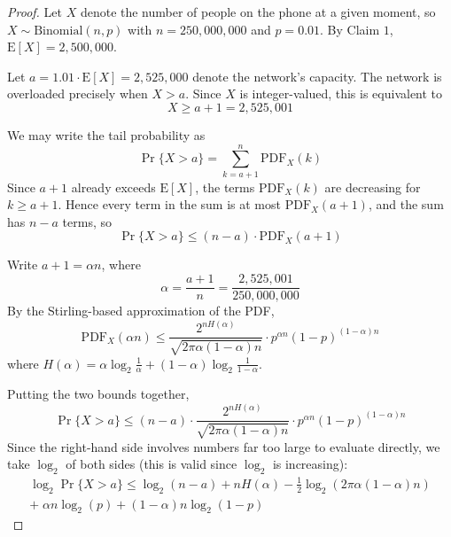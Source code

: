 \documentclass{article}
\begin{document}
\begin{proof}
    Let $X$ denote the number of people on the phone at a given moment, so $X \sim \mathrm{Binomial}(n, p)$
    with $n = 250{,}000{,}000$ and $p = 0.01$. By Claim $1$, $\mathrm{E}[X] = 2{,}500{,}000$.

    \medskip
    
    Let $a = 1.01 \cdot \mathrm{E}[X] = 2{,}525{,}000$ denote the network's capacity. The network is
    overloaded precisely when $X > a$. Since $X$ is integer-valued, this is equivalent to
    \[
    X \geq a + 1 = 2{,}525{,}001
    \]

    \medskip

    We may write the tail probability as
    \[
    \Pr\{X > a\} = \sum_{k = a+1}^{n} \mathrm{PDF}_X(k)
    \]
    Since $a+1$ already exceeds $\mathrm{E}[X]$, the terms $\mathrm{PDF}_X(k)$ are decreasing for
    $k \geq a+1$. Hence every term in the sum is at most $\mathrm{PDF}_X(a+1)$, and the sum has
    $n - a$ terms, so
    \[
    \Pr\{X > a\} \leq (n-a)\cdot \mathrm{PDF}_X(a+1)
    \]

    \medskip

    Write $a + 1 = \alpha n$, where
    \[
    \alpha = \frac{a+1}{n} = \frac{2{,}525{,}001}{250{,}000{,}000}
    \]
    By the Stirling-based approximation of the PDF,
    \[
    \mathrm{PDF}_X(\alpha n) \leq \frac{2^{nH(\alpha)}}{\sqrt{2\pi\alpha(1-\alpha)n}}\cdot p^{\alpha n}(1-p)^{(1-\alpha)n}
    \]
    where $H(\alpha) = \alpha\log_2\frac{1}{\alpha} + (1-\alpha)\log_2\frac{1}{1-\alpha}$.

    \medskip

    Putting the two bounds together,
    \[
    \Pr\{X > a\} \leq (n-a)\cdot \frac{2^{nH(\alpha)}}{\sqrt{2\pi\alpha(1-\alpha)n}}\cdot p^{\alpha n}(1-p)^{(1-\alpha)n}
    \]
    Since the right-hand side involves numbers far too large to evaluate directly, we take
    $\log_2$ of both sides (this is valid since $\log_2$ is increasing):
    \[
    \begin{aligned}
    \log_2\Pr\{X > a\} \leq \log_2(n-a) + nH(\alpha) - \frac{1}{2}\log_2\left(2\pi\alpha(1-\alpha)n\right) \\ 
    +\; \alpha n\log_2(p) + (1-\alpha)n\log_2(1-p)
    \end{aligned}
    \]

    \medskip


\end{proof}
\end{document}
